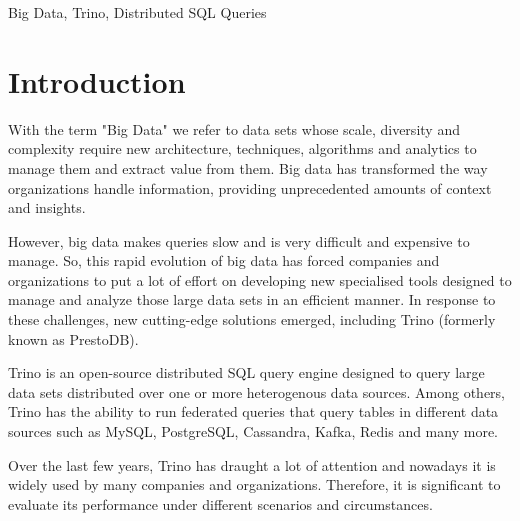 \documentclass[conference]{IEEEtran}
\begin{document}
\begin{IEEEkeywords}
Big Data, Trino, Distributed SQL Queries
\end{IEEEkeywords}

\section{Introduction}
With the term "Big Data" we refer to data sets whose scale, diversity and complexity require new
architecture, techniques, algorithms and analytics to manage them and extract value from them.
Big data has transformed the way organizations handle information, providing unprecedented amounts of context and insights.

However, big data makes queries slow and is very difficult and expensive to manage.
So, this rapid evolution of big data has forced companies and organizations to put a lot of effort on 
developing new specialised tools designed to manage and analyze those large data sets in an efficient manner.
In response to these challenges, new cutting-edge solutions emerged, including Trino (formerly known as PrestoDB).

Trino is an open-source distributed SQL query engine designed to query large data sets distributed over
one or more heterogenous data sources. Among others, Trino has the ability to run federated queries that
query tables in different data sources such as MySQL, PostgreSQL, Cassandra, Kafka, Redis and many more.

Over the last few years, Trino has draught a lot of attention and nowadays it is widely used by many 
companies and organizations. Therefore, it is significant to evaluate its performance under different 
scenarios and circumstances.
\end{document}
